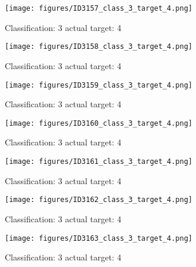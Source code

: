 \begin{figure}[h!]
\begin{center}
\texttt{[image: figures/ID3157\_class\_3\_target\_4.png]}
\end{center}
\caption{ Classification: 3 actual target: 4}
\label{fig:ID3157_class_3_target_4}
\end{figure}
\begin{figure}[h!]
\begin{center}
\texttt{[image: figures/ID3158\_class\_3\_target\_4.png]}
\end{center}
\caption{ Classification: 3 actual target: 4}
\label{fig:ID3158_class_3_target_4}
\end{figure}
\begin{figure}[h!]
\begin{center}
\texttt{[image: figures/ID3159\_class\_3\_target\_4.png]}
\end{center}
\caption{ Classification: 3 actual target: 4}
\label{fig:ID3159_class_3_target_4}
\end{figure}
\begin{figure}[h!]
\begin{center}
\texttt{[image: figures/ID3160\_class\_3\_target\_4.png]}
\end{center}
\caption{ Classification: 3 actual target: 4}
\label{fig:ID3160_class_3_target_4}
\end{figure}
\begin{figure}[h!]
\begin{center}
\texttt{[image: figures/ID3161\_class\_3\_target\_4.png]}
\end{center}
\caption{ Classification: 3 actual target: 4}
\label{fig:ID3161_class_3_target_4}
\end{figure}
\begin{figure}[h!]
\begin{center}
\texttt{[image: figures/ID3162\_class\_3\_target\_4.png]}
\end{center}
\caption{ Classification: 3 actual target: 4}
\label{fig:ID3162_class_3_target_4}
\end{figure}
\begin{figure}[h!]
\begin{center}
\texttt{[image: figures/ID3163\_class\_3\_target\_4.png]}
\end{center}
\caption{ Classification: 3 actual target: 4}
\label{fig:ID3163_class_3_target_4}
\end{figure}
